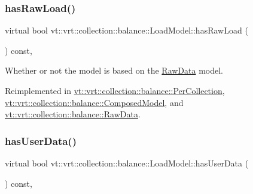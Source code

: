 \mbox{\label{structvt_1_1vrt_1_1collection_1_1balance_1_1_load_model_a626f65c651ea15f4a40b9f058778c620}} 
\subsubsection{\texorpdfstring{has\+Raw\+Load()}{hasRawLoad()}}
{\footnotesize\ttfamily virtual bool vt\+::vrt\+::collection\+::balance\+::\+Load\+Model\+::has\+Raw\+Load (\begin{DoxyParamCaption}{ }\end{DoxyParamCaption}) const\hspace{0.3cm}{\ttfamily [inline]}, {\ttfamily [virtual]}}



Whether or not the model is based on the \hyperlink{structvt_1_1vrt_1_1collection_1_1balance_1_1_raw_data}{Raw\+Data} model. 



Reimplemented in \hyperlink{structvt_1_1vrt_1_1collection_1_1balance_1_1_per_collection_a82a94bbf8764a3c6bd346e4a686e1efb}{vt\+::vrt\+::collection\+::balance\+::\+Per\+Collection}, \hyperlink{classvt_1_1vrt_1_1collection_1_1balance_1_1_composed_model_ad6e2a1c572a80e35acad0fcf1a0e8071}{vt\+::vrt\+::collection\+::balance\+::\+Composed\+Model}, and \hyperlink{structvt_1_1vrt_1_1collection_1_1balance_1_1_raw_data_a81391396ba96f5bc7578ac6d07d968ce}{vt\+::vrt\+::collection\+::balance\+::\+Raw\+Data}.

\mbox{\label{structvt_1_1vrt_1_1collection_1_1balance_1_1_load_model_a100e482fde649bb7e4e1e2b62419e200}} 
\subsubsection{\texorpdfstring{has\+User\+Data()}{hasUserData()}}
{\footnotesize\ttfamily virtual bool vt\+::vrt\+::collection\+::balance\+::\+Load\+Model\+::has\+User\+Data (\begin{DoxyParamCaption}{ }\end{DoxyParamCaption}) const\hspace{0.3cm}{\ttfamily [inline]}, {\ttfamily [virtual]}}



